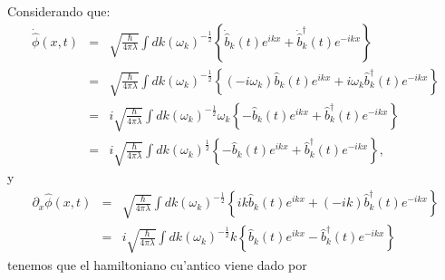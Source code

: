 Considerando que:
\begin{eqnarray}
\dot{\hat{\phi}}(x,t) & = &\sqrt{\frac{\hbar}{4\pi\lambda}
}\int dk\left( \omega_k\right) ^{-\frac{1}{2}}\left\{ \dot{\hat{b}}_k\left(
t\right) e^{ikx}+\dot{\hat{b}}_k^\dagger (t) e^{-ikx}\right\} \\
& = &\sqrt{\frac{\hbar}{4\pi\lambda}}\int dk\left( \omega_k\right) ^{-\frac
{1}{2}}\left\{ \left( -i\omega_k\right) \hat{b}_k(t)
e^{ikx}+i\omega_k\hat{b}_k^\dagger (t) e^{-ikx}\right\} \\
& = &i\sqrt{\frac{\hbar}{4\pi\lambda}}\int dk\left( \omega_k\right) ^{-\frac
{1}{2}}\omega_k\left\{ -\hat{b}_k(t) e^{ikx}+\hat{b}_k^\dagger (t) e^{-ikx}\right\} \\
& = &i\sqrt{\frac{\hbar}{4\pi\lambda}}\int dk\left( \omega_k\right) ^{\frac
{1}{2}}\left\{ -\hat{b}_k(t) e^{ikx}+\hat{b}_k^{\dagger
}(t) e^{-ikx}\right\} ,
\end{eqnarray}
y
\begin{eqnarray}
\partial_{x}\hat{\phi}(x,t) & = &\sqrt{\frac{\hbar}{4\pi\lambda}}\int
dk\left( \omega_k\right) ^{-\frac{1}{2}}\left\{ ik\hat{b}_k\left(
t\right) e^{ikx}+\left( -ik\right) \hat{b}_k^\dagger (t)
e^{-ikx}\right\} \\
& = &i\sqrt{\frac{\hbar}{4\pi\lambda}}\int dk\left( \omega_k\right) ^{-\frac
{1}{2}}k\left\{ \hat{b}_k(t) e^{ikx}-\hat{b}_k^{\dagger
}(t) e^{-ikx}\right\}
\end{eqnarray}
tenemos que el hamiltoniano cu'antico viene dado por
